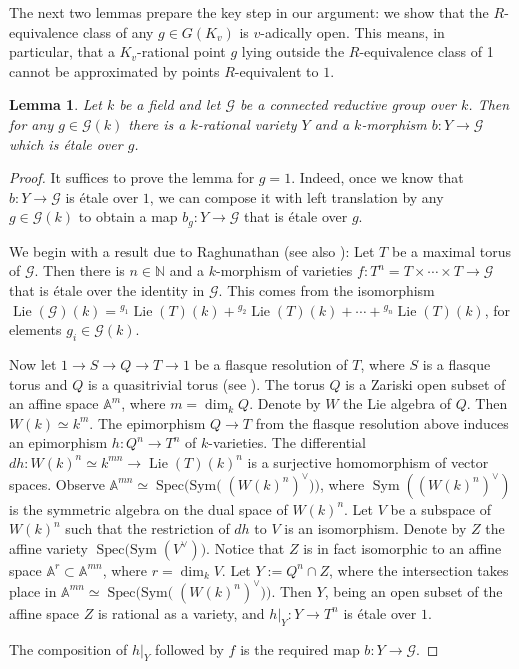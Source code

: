 \documentclass[11pt,letterpaper]{amsart}
\theoremstyle{plain}
\newtheorem{lemma}[theorem]{Lemma}
\theoremstyle{definition}
\theoremstyle{remark}
\begin{document}
    The next two lemmas prepare the key step in our argument: we show that the $R$-equivalence class of any $g\in G(K_v)$ is $v$-adically open. This means, in particular, that a $K_v$-rational point $g$ lying outside the $R$-equivalence class of 1 cannot be approximated by points $R$-equivalent to $1$.

    \begin{lemma}\label{raghunathan}
        Let $k$ be a field and let $\mathcal{G}$ be a connected reductive group over $k$. Then for any $g\in \mathcal{G}(k)$ there is a $k$-rational variety $Y$ and a $k$-morphism $b\colon Y\to \mathcal{G}$ which is \'{e}tale over $g$.
    \end{lemma}
    \begin{proof}
        It suffices to prove the lemma for $g=1$. Indeed, once we know that $b\colon Y\to\mathcal{G}$ is \'{e}tale over $1$, we can compose it with left translation by any $g\in\mathcal{G}(k)$ to obtain a map $b_g\colon Y\to\mathcal{G}$ that is \'{e}tale over $g$.
        
        
        We begin with a result due to Raghunathan \cite[\S 1.2]{raghunathan1994principal} (see also \cite[Proposition 3.7(1)]{gille2026local}): Let $T$ be a maximal torus of $\mathcal{G}$. Then there is $n\in\mathbb{N}$ and a $k$-morphism of varieties $f:T^n = T\times \cdots\times T\to \mathcal{G}$ that is \'{e}tale over the identity in $\mathcal{G}$. This comes from the isomorphism $\operatorname{Lie}(\mathcal{G})(k) = \mbox{}^{g_1}\operatorname{Lie}(T)(k) + \mbox{}^{g_2}\operatorname{Lie}(T)(k) + \cdots + \mbox{}^{g_n}\operatorname{Lie}(T)(k)$, for elements $g_i\in \mathcal{G}(k)$.

        Now let $1\to S\to Q\to T\to 1$ be a flasque resolution of $T$, where $S$ is a flasque torus and $Q$ is a quasitrivial torus (see \cite[Th\'{e}or\`{e}me 2]{colliot1977r}). The torus $Q$ is a Zariski open subset of an affine space $\mathbb{A}^m$, where $m = \dim_k Q$. Denote by $W$ the Lie algebra of $Q$. Then $W(k)\simeq k^m$.
        The epimorphism $Q\to T$ from the flasque resolution above induces an epimorphism $h\colon Q^n\to T^n$ of $k$-varieties. The differential $dh\colon W(k)^n\simeq k^{mn}\to \operatorname{Lie}(T)(k)^n$ is a surjective homomorphism of vector spaces. Observe $\mathbb{A}^{mn}\simeq \operatorname{Spec(Sym(}(W(k)^n)^\lor))$, where $\operatorname{Sym}((W(k)^n)^\lor)$ is the symmetric algebra on the dual space of $W(k)^n$. Let $V$ be a subspace of $W(k)^n$ such that the restriction of $dh$ to $V$ is an isomorphism.
        Denote by $Z$ the affine variety $\operatorname{Spec(Sym}(V^\lor))$. Notice that $Z$ is in fact isomorphic to an affine space $\mathbb{A}^r\subset\mathbb{A}^{mn}$, where $r = \dim_k V$.
        Let $Y:= Q^n\cap Z$, where the intersection takes place in $\mathbb{A}^{mn}\simeq \operatorname{Spec(Sym(}(W(k)^n)^\lor))$. Then $Y$, being an open subset of the affine space $Z$ is rational as a variety, and $h|_Y\colon Y\to T^n$ is \'{e}tale over $1$.

        The composition of $h|_Y$ followed by $f$ is the required map $b\colon Y\to \mathcal{G}$.
    \end{proof}
\end{document}
